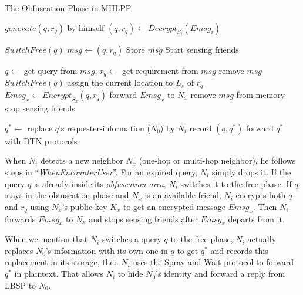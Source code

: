 \begin{algorithm} [tbp]
\caption{The Obfuscation Phase in MHLPP}\label{AlgObfMhlpp}
\begin{algorithmic}[1]
	\State $generate\left (q,r_q\right)$ by himself
\Else 
		\State $\left (q,r_q\right) \gets {Decrypt}_{S_i}\left({Emsg}_i\right)$
	\EndIf
\EndIf

	\State $SwitchFree\left(q\right)$
\Else 
	\State $msg \gets \left (q,r_q\right)$
	\State Store $msg$
	\State Start sensing friends
\EndIf
\EndProcedure

\State $q \gets$ get query from $msg$, $r_q \gets$ get requirement from $msg$
	\State remove $msg$
	\Return
\EndIf
{}
	\State $SwitchFree\left(q\right)$
	\Return
\EndIf
{}
		\State assign the current location to $L_s$ of $r_q$
	\EndIf
	\State ${Emsg}_x \gets {Encrypt}_{S_x}\left(q,r_q\right)$
	\State forward ${Emsg}_x$ to $N_x$
	\State remove $msg$ from memory
	\State stop sensing friends
\EndIf
\EndProcedure

\State ${q^*} \gets$ replace $q$'s requester-information ($N_0$) by $N_i$
\State record $\left(q,q^*\right)$
\State forward $q^*$ with DTN protocols
\EndProcedure
\end{algorithmic}
\end{algorithm}

When ${N}_{i}$ detects a new neighbor ${N}_{x}$ (one-hop or multi-hop neighbor), he follows steps in ``\textit{WhenEncounterUser}''. For an expired query, ${N}_{i}$ simply drops it. If the query $q$ is already inside its \textit{obfuscation area}, ${N}_{i}$ switches it to the free phase. If $q$ stays in the obfuscation phase and ${N}_{x}$ is an available friend, ${N}_{i}$ encrypts both $q$ and $r_q$ using ${N}_{x}$'s public key ${K}_{x}$ to get an encrypted message ${Emsg}_{x}$. Then ${N}_{i}$ forwards ${Emsg}_{x}$ to ${N}_{x}$ and stops sensing friends after ${Emsg}_{x}$ departs from it.

When we mention that ${N}_{i}$ switches a query $q$ to the free phase, ${N}_{i}$ actually replaces $N_0$'s information with its own one in $q$ to get ${q}^{*}$ and records this replacement in its storage, then ${N}_{i}$ uses the Spray and Wait protocol \cite{C31} to forward ${q}^{*}$ in plaintext. That allows ${N}_{i}$ to hide $N_0$'s identity and forward a reply from LBSP to $N_0$.


